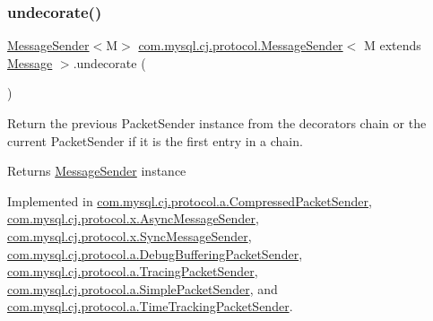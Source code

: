 \subsubsection{\texorpdfstring{undecorate()}{undecorate()}}
{\footnotesize\ttfamily \mbox{\hyperlink{interfacecom_1_1mysql_1_1cj_1_1protocol_1_1_message_sender}{Message\+Sender}}$<$M$>$ \mbox{\hyperlink{interfacecom_1_1mysql_1_1cj_1_1protocol_1_1_message_sender}{com.\+mysql.\+cj.\+protocol.\+Message\+Sender}}$<$ M extends \mbox{\hyperlink{interfacecom_1_1mysql_1_1cj_1_1protocol_1_1_message}{Message}} $>$.undecorate (\begin{DoxyParamCaption}{ }\end{DoxyParamCaption})}

Return the previous Packet\+Sender instance from the decorators chain or the current Packet\+Sender if it is the first entry in a chain.

\begin{DoxyReturn}{Returns}
\mbox{\hyperlink{interfacecom_1_1mysql_1_1cj_1_1protocol_1_1_message_sender}{Message\+Sender}} instance 
\end{DoxyReturn}


Implemented in \mbox{\hyperlink{classcom_1_1mysql_1_1cj_1_1protocol_1_1a_1_1_compressed_packet_sender_a3784dddfd77b45c384a6bb19f67fc2cc}{com.\+mysql.\+cj.\+protocol.\+a.\+Compressed\+Packet\+Sender}}, \mbox{\hyperlink{classcom_1_1mysql_1_1cj_1_1protocol_1_1x_1_1_async_message_sender_a4e7623346f23221fb9ff562c11c851e6}{com.\+mysql.\+cj.\+protocol.\+x.\+Async\+Message\+Sender}}, \mbox{\hyperlink{classcom_1_1mysql_1_1cj_1_1protocol_1_1x_1_1_sync_message_sender_aa8fd388e5d4e5e86cb35add7f6e45c7b}{com.\+mysql.\+cj.\+protocol.\+x.\+Sync\+Message\+Sender}}, \mbox{\hyperlink{classcom_1_1mysql_1_1cj_1_1protocol_1_1a_1_1_debug_buffering_packet_sender_a64d9081f4ce1701a67747cbb9462d4f3}{com.\+mysql.\+cj.\+protocol.\+a.\+Debug\+Buffering\+Packet\+Sender}}, \mbox{\hyperlink{classcom_1_1mysql_1_1cj_1_1protocol_1_1a_1_1_tracing_packet_sender_aed3dc47d6e7a4dad4761e05b2f9213de}{com.\+mysql.\+cj.\+protocol.\+a.\+Tracing\+Packet\+Sender}}, \mbox{\hyperlink{classcom_1_1mysql_1_1cj_1_1protocol_1_1a_1_1_simple_packet_sender_a7258a5245f263cf4635daba8be258e36}{com.\+mysql.\+cj.\+protocol.\+a.\+Simple\+Packet\+Sender}}, and \mbox{\hyperlink{classcom_1_1mysql_1_1cj_1_1protocol_1_1a_1_1_time_tracking_packet_sender_a5e29cda7005857f658352ef487c541ac}{com.\+mysql.\+cj.\+protocol.\+a.\+Time\+Tracking\+Packet\+Sender}}.

\mbox{\label{interfacecom_1_1mysql_1_1cj_1_1protocol_1_1_message_sender_a8066931f03c2fa9cc705716fa10a4517}} 
